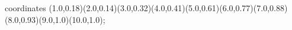 					coordinates { (1.0,0.18)(2.0,0.14)(3.0,0.32)(4.0,0.41)(5.0,0.61)(6.0,0.77)(7.0,0.88)(8.0,0.93)(9.0,1.0)(10.0,1.0)};
